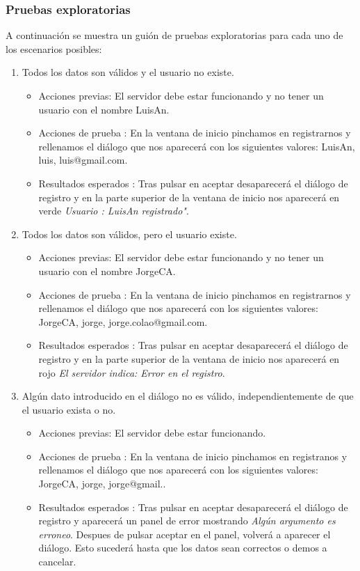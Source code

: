 \subsubsection{Pruebas exploratorias}

A continuación se muestra un guión de pruebas exploratorias para cada uno de los escenarios posibles:
\begin{enumerate}
\item Todos los datos son válidos y el usuario no existe.
	\begin{itemize}
	\item Acciones previas: El servidor debe estar funcionando y no tener un usuario con el nombre LuisAn.
	\item Acciones de prueba : En la ventana de inicio pinchamos en registrarnos y rellenamos el diálogo que nos aparecerá con los siguientes valores: LuisAn, luis, luis@gmail.com.
	\item Resultados esperados : Tras pulsar en aceptar  desaparecerá el diálogo de registro y en la parte superior de la ventana de inicio nos aparecerá en verde \emph {Usuario : LuisAn registrado"}.
	\end{itemize}
\item Todos los datos son válidos, pero el usuario existe.
	\begin{itemize}
	\item Acciones previas: El servidor debe estar funcionando y no tener un usuario con el nombre JorgeCA.
	\item Acciones de prueba : En la ventana de inicio pinchamos en registrarnos y rellenamos el diálogo que nos aparecerá con los siguientes valores: JorgeCA, jorge, jorge.colao@gmail.com.
	\item Resultados esperados : Tras pulsar en aceptar desaparecerá el diálogo de registro y en la parte superior de la ventana de inicio nos aparecerá en rojo \emph {El servidor indica: Error en el registro}.
	\end{itemize}

\item Algún dato introducido en el diálogo no es válido, independientemente de que el usuario exista o no.
	\begin{itemize}
	\item Acciones previas: El servidor debe estar funcionando.
	\item Acciones de prueba : En la ventana de inicio pinchamos en registranos y rellenamos el diálogo que nos aparecerá con los siguientes valores: JorgeCA, jorge, jorge@gmail..
	\item Resultados esperados : Tras pulsar en aceptar desaparecerá el diálogo de registro y aparecerá un panel de error mostrando \emph{Algún argumento es erroneo}. Despues de pulsar aceptar en el panel, volverá a aparecer el diálogo. Esto sucederá hasta que los datos sean correctos o demos a cancelar.
	\end{itemize}
\end{enumerate}
